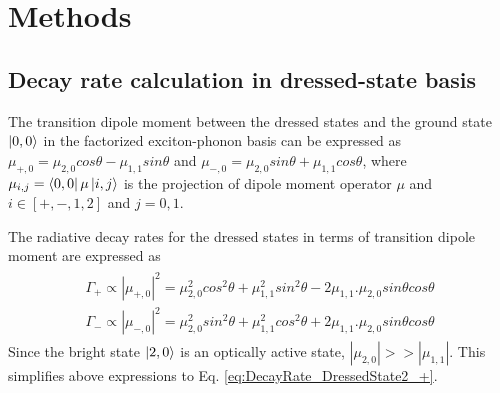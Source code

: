 \documentclass[aps,pra,preprint,groupedaddress]{revtex4-1}
\begin{document}
\section*{Methods} 
\subsection{Decay rate calculation in dressed-state basis} 
\label{appendix:DecayRate}
The transition dipole moment between the dressed states and the ground state $\ket{0,0}$ in the factorized exciton-phonon basis can be expressed as $\mu_{+,0}=\mu_{2,0}cos\theta-\mu_{1,1}sin\theta$ and $\mu_{-,0}=\mu_{2,0}sin\theta+\mu_{1,1}cos\theta $, where $\mu_{i,j} = \bra{0,0}\mu\ket{i,j}$ is the projection of dipole moment operator $\mu$ and $i\in[+,-,1,2]$ and $j =0,1$. 

The radiative decay rates for the dressed states in terms of transition dipole moment are expressed as \cite{Reynaud1977}
\begin{eqnarray}
\begin{aligned}
\label{eq:DecayRate_DressedState1_+-}
\Gamma_+ \propto |\mu_{+,0}|^2 = \mu_{2,0}^2 cos^2\theta+\mu_{1,1}^2 sin^2\theta-2\mu_{1,1}.\mu_{2,0}sin\theta cos\theta \\
\Gamma_- \propto |\mu_{-,0}|^2 =\mu_{2,0}^2 sin^2\theta+\mu_{1,1}^2 cos^2\theta+2\mu_{1,1}.\mu_{2,0}sin\theta cos\theta 
\end{aligned}
\end{eqnarray}
Since the bright state $\ket{2,0}$ is an optically active state, $|\mu_{2,0}| >> |\mu_{1,1}|$. This simplifies above expressions to Eq. \ref{eq:DecayRate_DressedState2_+}.
\end{document}
